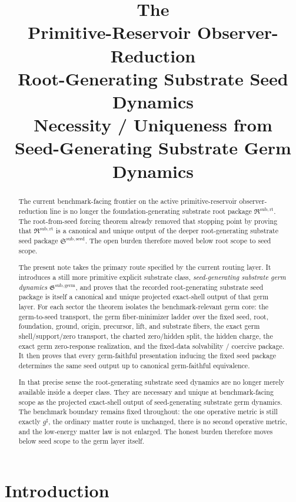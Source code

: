 \documentclass[11pt]{article}
\title{\textbf{The \TheoryName{}}\\[0.4em]
\large Primitive-Reservoir Observer-Reduction\\
\large Root-Generating Substrate Seed Dynamics\\
\large Necessity / Uniqueness from\\
\large Seed-Generating Substrate Germ Dynamics}
\author{}
\date{}
\newcommand{\CompletedMetric}{g^{\sharp}}
\newcommand{\RootPackage}{\mathfrak R^{\mathrm{sub,rt}}}
\newcommand{\SeedPackage}{\mathfrak S^{\mathrm{sub,seed}}}
\newcommand{\GermPackage}{\mathfrak G^{\mathrm{sub,germ}}}
\begin{document}
\maketitle

\begin{abstract}
The current benchmark-facing frontier on the active primitive-reservoir observer-reduction line is no longer the foundation-generating substrate root package \(\RootPackage\). The root-from-seed forcing theorem already removed that stopping point by proving that \(\RootPackage\) is a canonical and unique output of the deeper root-generating substrate seed package \(\SeedPackage\). The open burden therefore moved below root scope to seed scope.

The present note takes the primary route specified by the current routing layer. It introduces a still more primitive explicit substrate class, \emph{seed-generating substrate germ dynamics} \(\GermPackage\), and proves that the recorded root-generating substrate seed package is itself a canonical and unique projected exact-shell output of that germ layer. For each sector the theorem isolates the benchmark-relevant germ core: the germ-to-seed transport, the germ fiber-minimizer ladder over the fixed seed, root, foundation, ground, origin, precursor, lift, and substrate fibers, the exact germ shell/support/zero transport, the charted zero/hidden split, the hidden charge, the exact germ zero-response realization, and the fixed-data solvability / coercive package. It then proves that every germ-faithful presentation inducing the fixed seed package determines the same seed output up to canonical germ-faithful equivalence.

In that precise sense the root-generating substrate seed dynamics are no longer merely available inside a deeper class. They are necessary and unique at benchmark-facing scope as the projected exact-shell output of seed-generating substrate germ dynamics. The benchmark boundary remains fixed throughout: the one operative metric is still exactly \(\CompletedMetric\), the ordinary matter route is unchanged, there is no second operative metric, and the low-energy matter law is not enlarged. The honest burden therefore moves below seed scope to the germ layer itself.
\end{abstract}

\section{Introduction}
\end{document}
